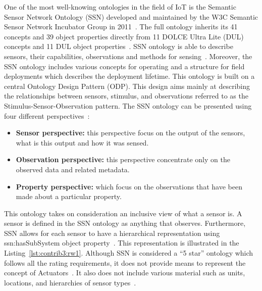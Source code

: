 One of the most well-knowing ontologies in the field of IoT is the Semantic Sensor Network Ontology (SSN) developed and maintained by the W3C Semantic Sensor Network Incubator Group in 2011~\cite{ssn}. The full ontology inherits its 41 concepts and 39 object properties directly from 11 DOLCE Ultra Lite (DUL) concepts and 11 DUL object properties~\cite{ssn}. SSN ontology is able to describe sensors, their capabilities, observations and methods for sensing~\cite{ssn}. Moreover, the SSN ontology includes various concepts for operating and a structure for field deployments which describes the deployment lifetime. This ontology is built on a central Ontology Design Pattern (ODP). This design aims mainly at describing the relationships between sensors, stimulus, and observations referred to as the Stimulus-Sensor-Observation pattern.
The SSN ontology can be presented using four different perspectives~\cite{ssn}: 
\begin{itemize}
\item \textbf{Sensor perspective:} this perspective focus on the output of the sensors, what is this output and how it was sensed. 
\item \textbf{Observation perspective:} this perspective concentrate only on the observed data and related metadata.
\item \textbf{Property perspective:} which focus on the observations that have been made about a particular property.
\end{itemize}
This ontology takes on consideration an inclusive view of what a sensor is. A sensor is defined in the SSN ontology as anything that observes. Furthermore, SSN allows for each sensor to have a hierarchical representation using ssn:hasSubSystem object property~\cite{rfr}. This representation is illustrated in the Listing~\ref{lst:contrib3:rw1}. Although SSN is considered a “5 star” ontology which follows all the rating requirements, it does not provide means to represent the concept of Actuators~\cite{rfr}. It also does not include various material such as units, locations, and hierarchies of sensor types~\cite{ssn}. \par 

\lstset{caption=An example of a System with a Temperature Sensor and a Pressure Sensor, label=lst:contrib3:rw1,
language=xml, breaklines=true, numbers=left, basicstyle=\small\ttfamily,
stepnumber=1, frame=single, inputencoding=utf8/latin1}~

